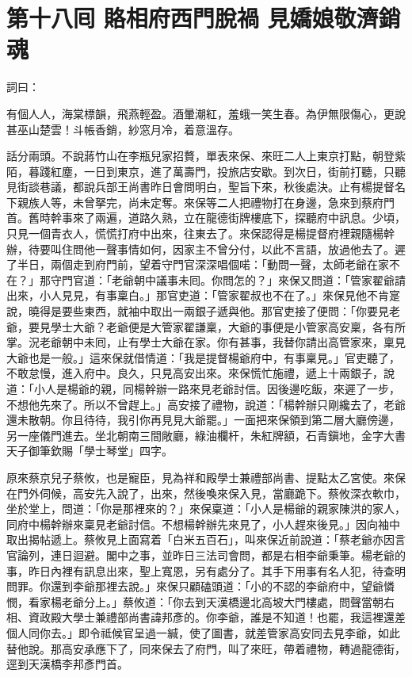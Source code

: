 
\chapter*{第十八囘 賂相府西門脫禍 見嬌娘敬濟銷魂}


詞曰：

\begin{myquote}
有個人人，海棠標韻，飛燕輕盈。酒暈潮紅，羞蛾一笑生春。為伊無限傷心，更說甚巫山楚雲！斗帳香銷，紗窓月冷，着意溫存。

\end{myquote}

話分兩頭。不說蔣竹山在李瓶兒家招贅，單表來保、來旺二人上東京打點，朝登紫陌，暮踐紅塵，一日到東京，進了萬壽門，投旅店安歇。到次日，街前打聽，只聽見街談巷議，都說兵部王尚書昨日會問明白，聖旨下來，秋後處決。止有楊提督名下親族人等，未曾拏完，尚未定奪。來保等二人把禮物打在身邊，急來到蔡府門首。舊時幹事來了兩遍，道路久熟，立在龍德街牌樓底下，探聽府中訊息。少頃，只見一個青衣人，慌慌打府中出來，往東去了。來保認得是楊提督府裡親隨楊幹辦，待要叫住問他一聲事情如何，因家主不曾分付，以此不言語，放過他去了。遲了半日，兩個走到府門前，望着守門官深深唱個喏：「動問一聲，太師老爺在家不在？」那守門官道：「老爺朝中議事未囘。你問怎的？」來保又問道：「管家翟爺請出來，小人見見，有事稟白。」那官吏道：「管家翟叔也不在了。」來保見他不肯寔說，曉得是要些東西，就袖中取出一兩銀子遞與他。那官吏接了便問：「你要見老爺，要見學士大爺？老爺便是大管家翟謙稟，大爺的事便是小管家高安稟，各有所掌。況老爺朝中未囘，{}止有學士大爺在家。你有甚事，我替你請出高管家來，稟見大爺也是一般。」這來保就借情道：「我是提督楊爺府中，有事稟見。」官吏聽了，不敢怠慢，進入府中。良久，只見高安出來。來保慌忙施禮，遞上十兩銀子，說道：「小人是楊爺的親，同楊幹辦一路來見老爺討信。因後邊吃飯，來遲了一步，不想他先來了。所以不曾趕上。」高安接了禮物，說道：「楊幹辦只剛纔去了，老爺還未散朝。你且待待，我引你再見見大爺罷。」一面把來保領到第二層大廳傍邊，另一座儀門進去。坐北朝南三間敞廳，綠油欄杆，朱紅牌額，石青鎭地，金字大書天子御筆欽賜「學士琴堂」四字。

原來蔡京兒子蔡攸，也是寵臣，見為祥和殿學士兼禮部尚書、提點太乙宮使。來保在門外伺候，高安先入說了，出來，然後喚來保入見，當廳跪下。蔡攸深衣軟巾，坐於堂上，問道：「你是那裡來的？」來保稟道：「小人是楊爺的親家陳洪的家人，同府中楊幹辦來稟見老爺討信。不想楊幹辦先來見了，小人趕來後見。」因向袖中取出揭帖遞上。蔡攸見上面寫着「白米五百石」，叫來保近前說道：「蔡老爺亦因言官論列，連日迴避。閣中之事，並昨日三法司會問，都是右相李爺秉筆。楊老爺的事，昨日內裡有訊息出來，聖上寬恩，另有處分了。其手下用事有名人犯，待查明問罪。你還到李爺那裡去說。」來保只顧磕頭道：「小的不認的李爺府中，望爺憐憫，看家楊老爺分上。」蔡攸道：「你去到天漢橋邊北高坡大門樓處，問聲當朝右相、資政殿大學士兼禮部尚書諱邦彥的。{}你李爺，誰是不知道！也罷，我這裡還差個人同你去。」即令祗候官呈過一緘，使了圖書，就差管家高安同去見李爺，如此替他說。那高安承應下了，同來保去了府門，叫了來旺，帶着禮物，轉過龍德街，逕到天漢橋李邦彥門首。

